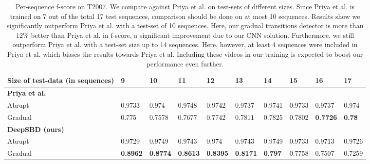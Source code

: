 \documentclass[journal]{IEEEtran}
\begin{document}
\begin{table*}
\small
\centering
\begin{tabular}{|l | l | l | l | l | l | l | l | l | l |}
     \hline      
			Size of test-data (in sequences)	& 9       &  10      &  11     & 12      & 13    & 14     & 15   & 16  & 17  \\
     \hline
			 \textbf{Priya et al. \cite{Priya14}}       &         &         &         &         &       &        &     &   &   \\
					Abrupt                                  &  0.9733 &  0.974 &  0.9748  &  0.9742 & 0.9737 & 0.9741  & 0.9733 & 0.9737 & 0.974\\
			    Gradual                                 &  0.775  &  0.7578  &  0.7677 &  0.7742 & 0.7811 & 0.7825 & 0.7802 & \textbf{0.7726} & \textbf{0.78} \\ 
			\hline
			\textbf{DeepSBD (ours)}                            &         &         &         &         &       &        &     &   &   \\
				 Abrupt                                   &  0.9729 &  0.9749  &  0.9743 &  0.974 & 0.9743 & 0.9749  & 0.9733   & 0.9713 & 0.9726\\ 
				 Gradual                                  &  \textbf{0.8962}  &  \textbf{0.8774} &  \textbf{0.8613} &  \textbf{0.8395}  & \textbf{0.8171} & \textbf{0.797}   & 0.7758 &  0.7507 & 0.7259\\ 
			\hline
    \end{tabular}\vspace{3pt}
\caption{Per-sequence f-score on T2007. We compare against Priya et al. \cite{Priya14} on test-sets of different sizes. Since Priya et al. \cite{Priya14} is trained on 7 out of the total 17 test sequences, comparison should be done on at most 10 sequences. Results show we significantly outperform Priya et al. with a test-set of 10 sequences. Here, our gradual transitions detector is more than $12\%$ better than Priya et al. in f-score, a significant improvement due to our CNN solution. Furthermore, we still outperform Priya et al. with a test-set size up to 14 sequences. Here, however, at least 4 sequences were included in Priya et al. which biases the results towards Priya et al. Including these videos in our training is expected to boost our performance even further.}
\label{tab:PriyaSummary}
\end{table*}
\end{document}

